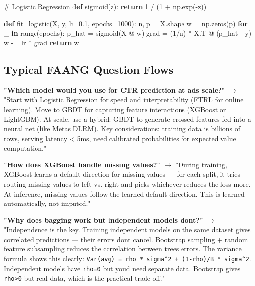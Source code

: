 \documentclass[11pt]{article}
\newenvironment{Shaded}{\begin{snugshade}}{\end{snugshade}}
\newcommand{\BuiltInTok}[1]{\textcolor[rgb]{0.50,0.55,0.55}{#1}}
\newcommand{\CommentTok}[1]{\textcolor[rgb]{0.48,0.49,0.49}{#1}}
\newcommand{\ControlFlowTok}[1]{\textcolor[rgb]{0.99,0.74,0.29}{\textbf{#1}}}
\newcommand{\DecValTok}[1]{\textcolor[rgb]{0.96,0.45,0.00}{#1}}
\newcommand{\FloatTok}[1]{\textcolor[rgb]{0.96,0.45,0.00}{#1}}
\newcommand{\KeywordTok}[1]{\textcolor[rgb]{0.81,0.81,0.76}{\textbf{#1}}}
\newcommand{\NormalTok}[1]{\textcolor[rgb]{0.81,0.81,0.76}{#1}}
\newcommand{\OperatorTok}[1]{\textcolor[rgb]{0.81,0.81,0.76}{#1}}
\begin{document}
\begin{Shaded}
\begin{Highlighting}[]
\CommentTok{\# Logistic Regression}
\KeywordTok{def}\NormalTok{ sigmoid(z):}
    \ControlFlowTok{return} \DecValTok{1} \OperatorTok{/}\NormalTok{ (}\DecValTok{1} \OperatorTok{+}\NormalTok{ np.exp(}\OperatorTok{{-}}\NormalTok{z))}

\KeywordTok{def}\NormalTok{ fit\_logistic(X, y, lr}\OperatorTok{=}\FloatTok{0.1}\NormalTok{, epochs}\OperatorTok{=}\DecValTok{1000}\NormalTok{):}
\NormalTok{    n, p }\OperatorTok{=}\NormalTok{ X.shape}
\NormalTok{    w }\OperatorTok{=}\NormalTok{ np.zeros(p)}
    \ControlFlowTok{for}\NormalTok{ \_ }\KeywordTok{in} \BuiltInTok{range}\NormalTok{(epochs):}
\NormalTok{        p\_hat }\OperatorTok{=}\NormalTok{ sigmoid(X }\OperatorTok{@}\NormalTok{ w)}
\NormalTok{        grad }\OperatorTok{=}\NormalTok{ (}\DecValTok{1}\OperatorTok{/}\NormalTok{n) }\OperatorTok{*}\NormalTok{ X.T }\OperatorTok{@}\NormalTok{ (p\_hat }\OperatorTok{{-}}\NormalTok{ y)}
\NormalTok{        w }\OperatorTok{{-}=}\NormalTok{ lr }\OperatorTok{*}\NormalTok{ grad}
    \ControlFlowTok{return}\NormalTok{ w}
\end{Highlighting}
\end{Shaded}

\subsection{Typical FAANG Question Flows}\label{typical-faang-question-flows}

\textbf{"Which model would you use for CTR prediction at ads scale?"}
\(\rightarrow\) "Start with Logistic Regression for speed and interpretability (FTRL for online learning). Move to GBDT for capturing feature interactions (XGBoost or LightGBM). At scale, use a hybrid: GBDT to generate crossed features fed into a neural net (like Meta\textquotesingle s DLRM). Key considerations: training data is billions of rows, serving latency \textless{} 5ms, need calibrated probabilities for expected value computation."

\textbf{"How does XGBoost handle missing values?"}
\(\rightarrow\) "During training, XGBoost learns a default direction for missing values --- for each split, it tries routing missing values to left vs. right and picks whichever reduces the loss more. At inference, missing values follow the learned default direction. This is learned automatically, not imputed."

\textbf{"Why does bagging work but independent models don\textquotesingle t?"}
\(\rightarrow\) "Independence is the key. Training independent models on the same dataset gives correlated predictions --- their errors don\textquotesingle t cancel. Bootstrap sampling + random feature subsampling reduces the correlation between trees\textquotesingle{} errors. The variance formula shows this clearly: \texttt{Var(avg)\ =\ rho\ *\ sigma\^{}2\ +\ (1-rho)/B\ *\ sigma\^{}2}. Independent models have \texttt{rho=0} but you\textquotesingle d need separate data. Bootstrap gives \texttt{rho\textgreater{}0} but real data, which is the practical trade-off."
\end{document}
